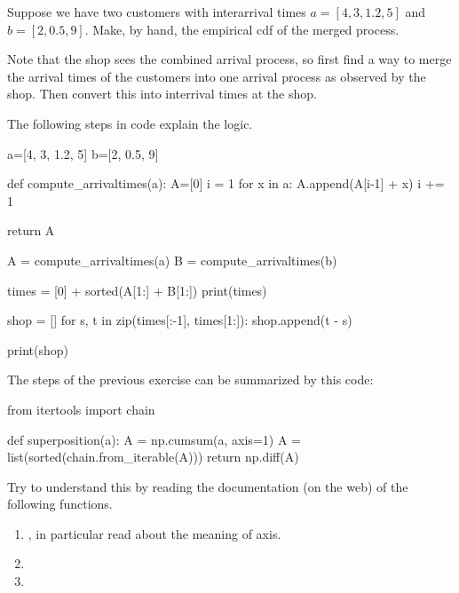 \documentclass{scrartcl}
\begin{document}
\begin{exercise}


  Suppose we have two customers with interarrival times $a=[4, 3, 1.2, 5]$ and $b=[2, 0.5, 9]$. Make, by hand, the empirical cdf of the merged process.

\hintsymbol

  \begin{hint}
Note that the shop sees the combined arrival process, so first find a way to merge the arrival times of the customers into one arrival process as observed by the shop. Then convert this into interrival times at the shop.
  \end{hint}
  \begin{solution}
    The following steps in code explain the logic.
    \begin{pyblock}
a=[4, 3, 1.2, 5]
b=[2, 0.5, 9]

def compute_arrivaltimes(a):
    A=[0]
    i = 1
    for x in a:
        A.append(A[i-1] + x)
        i += 1

    return A

A = compute_arrivaltimes(a)
B = compute_arrivaltimes(b)


times = [0] + sorted(A[1:] + B[1:]) 
print(times)

shop = []
for s, t in zip(times[:-1], times[1:]):
    shop.append(t - s)

print(shop)
    \end{pyblock}
  \end{solution}
\end{exercise}


\begin{exercise}
  The steps of the previous exercise can be summarized by this code:
\begin{pyverbatim}
from itertools import chain

def superposition(a):
    A = np.cumsum(a, axis=1)
    A = list(sorted(chain.from_iterable(A)))
    return np.diff(A)

\end{pyverbatim}  

Try to understand this by reading the documentation (on the web) of the following functions.
\begin{enumerate}
\item {}, in particular read about the meaning of axis.
\item {}
\item {}
\end{enumerate}
\end{exercise}
\end{document}
